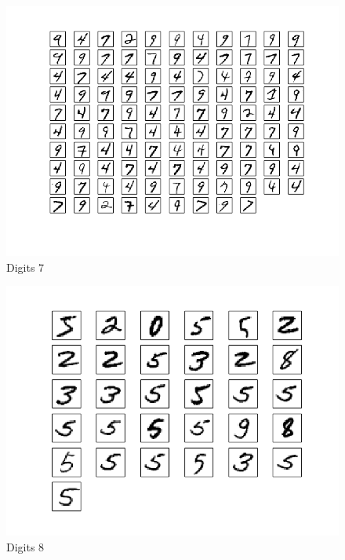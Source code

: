 \documentclass[10pt]{article}
\begin{document}
\begin{figure}
\begin{center}
\includegraphics[scale=0.5]{meansB7}
\caption{Digits 7}
\end{center}
\end{figure}
\begin{figure}
\begin{center}
\includegraphics[scale=0.5]{meansB8}
\caption{Digits 8}
\end{center}
\end{figure}
\end{document}
